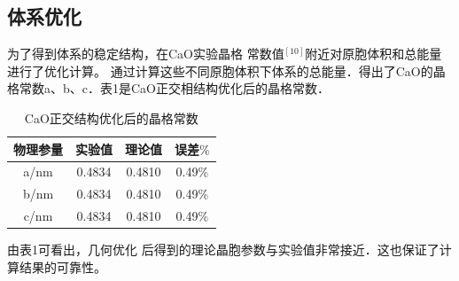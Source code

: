 \documentclass[12pt,a4paper]{article}%
\begin{document}
	\subsection{体系优化}
	为了得到体系的稳定结构，在CaO实验晶格
	常数值$^{[10]}$附近对原胞体积和总能量进行了优化计算。
	通过计算这些不同原胞体积下体系的总能量．得出了CaO的晶格常数a、b、c．表1是CaO正交相结构优化后的晶格常数．
	\begin{table}[H]
		\begin{center}
			\caption{CaO正交结构优化后的晶格常数}
			\resizebox{\textwidth}{!}
			{\begin{tabular}{c c c c }
					\toprule[2pt]
					\multicolumn{1}{m{3cm}}{\centering \textbf{物理参量}}	&\multicolumn{1}{m{3cm}}{\centering \textbf{实验值} }&\multicolumn{1}{m{3cm}}{\centering \textbf{理论值} }&\multicolumn{1}{m{3cm}}{\centering \textbf{误差}$\%$ }\\
					\midrule
					a/nm & 0.4834 &0.4810 &0.49$\%$\\
					b/nm & 0.4834 &0.4810 & 0.49$\%$  \\
					c/nm & 0.4834 &0.4810 & 0.49$\%$ \\
					\bottomrule[2pt]
			\end{tabular}}
		\end{center}
	\end{table}
	\vspace{-0.8cm}
	由表1可看出，几何优化
	后得到的理论晶胞参数与实验值非常接近．这也保证了计算结果的可靠性。
\end{document}
